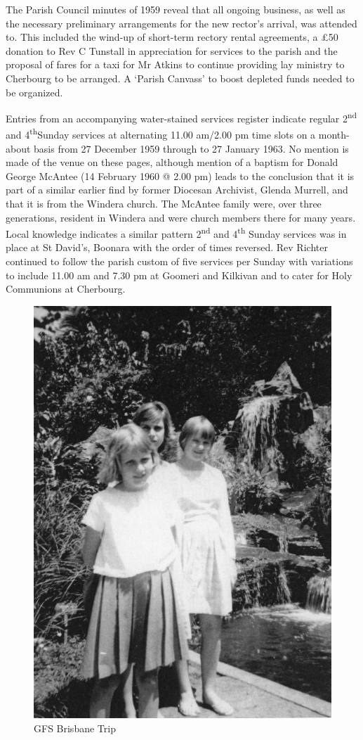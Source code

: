 The Parish Council minutes of 1959 reveal that all ongoing business, as well as the necessary preliminary arrangements for the new rector's arrival, was attended to. This included the wind-up of short-term rectory rental agreements, a \pounds50 donation to Rev C Tunstall in appreciation for services to the parish and the proposal of  fares for a taxi for Mr Atkins to continue providing lay ministry to Cherbourg to be arranged. A `Parish Canvass' to boost depleted funds needed to be organized.



Entries from an accompanying water-stained services register indicate regular 2\textsuperscript{nd} and 4\textsuperscript{th}Sunday services at alternating 11.00 am/2.00 pm time slots on a month-about basis from 27 December 1959 through to 27 January 1963. No mention is made of the venue on these pages, although mention of a baptism for Donald George McAntee (14 February 1960 @ 2.00 pm) leads to the conclusion that it is part of a similar earlier find by former Diocesan Archivist, Glenda Murrell, and that it is from the Windera church. The McAntee family were, over three generations, resident in Windera and were church members there for many years. Local knowledge indicates a similar pattern 2\textsuperscript{nd} and 4\textsuperscript{th} Sunday services was in place at St David's, Boonara with the order of times reversed. Rev Richter continued to follow the parish custom of five services per Sunday with variations to include 11.00 am and 7.30 pm at Goomeri and Kilkivan and to cater for Holy Communions at Cherbourg.









\begin{figure}
\begin{center}
\includegraphics[width=.6\linewidth,center]{../images/gfsBrisbaneTrip.jpg}
\caption{GFS Brisbane Trip}
\end{center}
\end{figure}




